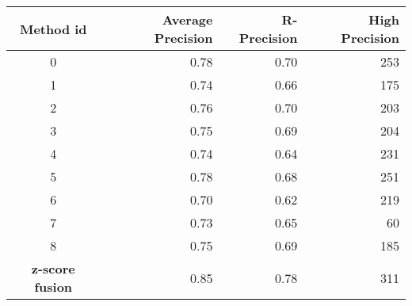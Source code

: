 \begin{table}[H]
  \label{tab:9rl_results_st_jean_A_B}
  \begin{tabular}{c r r r}
    \toprule
    Method id &
    Average Precision &
    R-Precision &
    High Precision \\
    \midrule
    0 & 0.78 & 0.70 & 253 \\
    1 & 0.74 & 0.66 & 175 \\
    2 & 0.76 & 0.70 & 203 \\
    3 & 0.75 & 0.69 & 204 \\
    4 & 0.74 & 0.64 & 231 \\
    5 & 0.78 & 0.68 & 251 \\
    6 & 0.70 & 0.62 & 219 \\
    7 & 0.73 & 0.65 &  60 \\
    8 & 0.75 & 0.69 & 185 \\
    \textbf{z-score fusion} & 0.85 & 0.78 & 311 \\
    \bottomrule
  \end{tabular}

\end{table}
